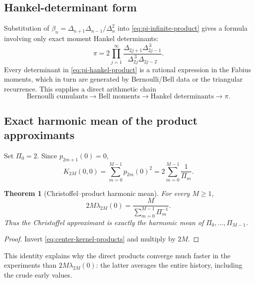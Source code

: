\documentclass[11pt,oneside]{article}
\newtheorem{theorem}{Theorem}[section]
\theoremstyle{definition}
\theoremstyle{remark}
\numberwithin{equation}{section}
\begin{document}
\subsection{Hankel-determinant form}
Substitution of
$\beta_n=\Delta_{n+1}\Delta_{n-1}/\Delta_n^2$ into
\cref{eq:pi-infinite-product} gives a formula involving only exact moment
Hankel determinants:
\begin{equation}
 \boxed{
 \pi=2\prod_{j=1}^{\infty}
 \frac{\Delta_{2j+1}\Delta_{2j-1}^{\,3}}
      {\Delta_{2j}^{\,3}\Delta_{2j-2}}.}
 \label{eq:pi-hankel-product}
\end{equation}
Every determinant in \cref{eq:pi-hankel-product} is a rational expression in
the Fabius moments, which in turn are generated by Bernoulli/Bell data or the
triangular recurrence.  This supplies a direct arithmetic chain
\begin{equation}
 \text{Bernoulli cumulants}
 \longrightarrow \text{Bell moments}
 \longrightarrow \text{Hankel determinants}
 \longrightarrow \pi.
 \label{eq:bernoulli-to-pi-chain}
\end{equation}

\subsection{Exact harmonic mean of the product approximants}
Set $\Pi_0=2$.  Since $p_{2m+1}(0)=0$,
\begin{equation}
 K_{2M}(0,0)=\sum_{m=0}^{M-1}p_{2m}(0)^2
 =2\sum_{m=0}^{M-1}\frac1{\Pi_m}.
 \label{eq:center-kernel-products}
\end{equation}

\begin{theorem}[Christoffel--product harmonic mean]
\label{thm:harmonic-mean}
For every $M\ge1$,
\begin{equation}
 \boxed{
 2M\lambda_{2M}(0)
 =\frac{M}{\displaystyle\sum_{m=0}^{M-1}\Pi_m^{-1}}.}
 \label{eq:harmonic-mean}
\end{equation}
Thus the Christoffel approximant is exactly the harmonic mean of
$\Pi_0,\ldots,\Pi_{M-1}$.
\end{theorem}

\begin{proof}
Invert \cref{eq:center-kernel-products} and multiply by $2M$.
\end{proof}

This identity explains why the direct products converge much faster in the
experiments than $2M\lambda_{2M}(0)$: the latter averages the entire history,
including the crude early values.
\end{document}
